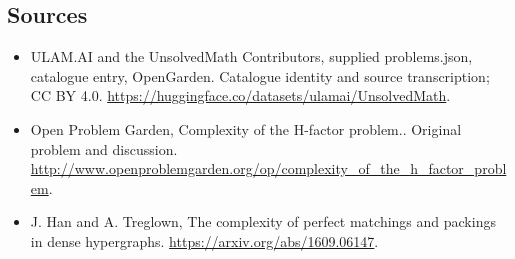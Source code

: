 \documentclass[11pt,a4paper]{article}
\begin{document}
\subsection{Sources}
\begin{itemize}
\item[S1] ULAM.AI and the UnsolvedMath Contributors, supplied problems.json, catalogue entry, OpenGarden. Catalogue identity and source transcription; CC BY 4.0.
\url{https://huggingface.co/datasets/ulamai/UnsolvedMath}.
\item[S2] Open Problem Garden, Complexity of the H-factor problem.. Original problem and discussion.
\url{http://www.openproblemgarden.org/op/complexity_of_the_h_factor_problem}.
\item[S3] J. Han and A. Treglown, The complexity of perfect matchings and packings in dense hypergraphs.
\url{https://arxiv.org/abs/1609.06147}.
\end{itemize}
\end{document}
